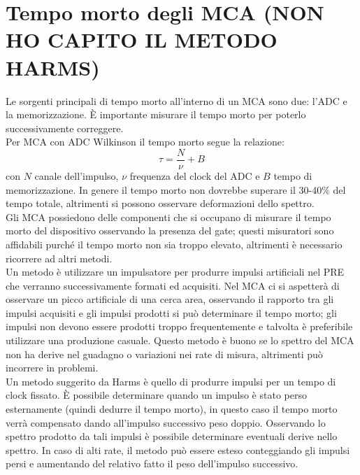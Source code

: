 \section{Tempo morto degli MCA (NON HO CAPITO IL METODO HARMS)}
Le sorgenti principali di tempo morto all'interno di un MCA sono due: l'ADC e la memorizzazione.
\`E importante misurare il tempo morto per poterlo successivamente correggere.\\
Per MCA con ADC Wilkinson il tempo morto segue la relazione:
\begin{equation*}
\tau = \frac{N}{\nu}  + B
\end{equation*}
con $N$ canale dell'impulso, $\nu$ frequenza del clock del ADC e $B$ tempo di memorizzazione.
In genere il tempo morto non dovrebbe superare il 30-40\% del tempo totale, altrimenti si possono osservare deformazioni dello spettro.\\
Gli MCA possiedono delle componenti che si occupano di misurare il tempo morto del dispositivo osservando la presenza del gate; questi misuratori sono affidabili purch\'e il tempo morto
non sia troppo elevato, altrimenti \`e necessario ricorrere ad altri metodi.\\
Un metodo \`e utilizzare un impulsatore per produrre impulsi artificiali nel PRE che verranno successivamente formati ed acquisiti.
Nel MCA ci si aspetter\`a di osservare un picco artificiale di una cerca area, osservando il rapporto tra gli impulsi acquisiti e gli impulsi prodotti si pu\`o determinare
il tempo morto; gli impulsi non devono essere prodotti troppo frequentemente e talvolta \`e preferibile utilizzare una produzione casuale.
Questo metodo \`e buono se lo spettro del MCA non ha derive nel guadagno o variazioni nei rate di misura, altrimenti pu\`o incorrere in problemi.\\
Un metodo suggerito da Harms \`e quello di produrre impulsi per un tempo di clock fissato.
\`E possibile determinare quando un impulso \`e stato perso esternamente (quindi dedurre il tempo morto),
in questo caso il tempo morto verr\`a compensato dando all'impulso successivo peso doppio.
Osservando lo spettro prodotto da tali impulsi \`e possibile determinare eventuali derive nello spettro. 
In caso di alti rate, il metodo pu\`o essere esteso conteggiando gli impulsi persi e aumentando del relativo fatto il peso dell'impulso successivo.
